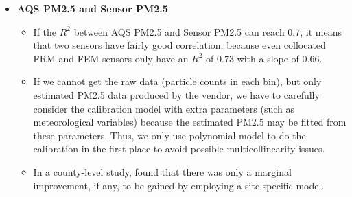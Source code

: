 \documentclass{article}
\begin{document}
\begin{itemize}
{\begin{itemize}
\begin{itemize}
                \end{itemize}
            \item \textbf{High and low volume air samplers/Gravimetric filters (FRM)}: high and low volume air samplers are instruments used to collect samples of air particles. The difference between high and low volume air samplers is the amount of air sampled\footnote{High volume: $1500\;m^3/24\;h$; Low volume: $\leq24\;m^3/24\;h$}. Steps: 1) The inlet removes particles larger than $10 \mu m$/$2.5 \mu m$ by using their greater inertia; 2) measuring the volume of air sampled and weighing the filters before and after sampling determines the concentration of PM10/PM2.5 particles in the air.
            \item \textbf{Beta attenuation monitoring (FEM)}: BAM employs the absorption of beta radiation\footnote{Beta radiation is a high-energy, high-speed electron or positron emitted by the radioactive decay of an atomic nucleus during the process of beta decay.} by solid particles extracted from air flow. The main principle is based on a kind of Bouguer (Lambert–Beer) law: the amount by which the flow of beta radiation (electrons) is attenuated by a solid matter is exponentially dependent on its mass and not on any other feature (such as density, chemical composition or some optical or electrical properties) of this matter.
        \end{itemize}
    }
    \item \textbf{AQS PM2.5 and Sensor PM2.5} {
        \begin{itemize}
            \item If the $R^2$ between AQS PM2.5 and Sensor PM2.5 can reach 0.7, it means that two sensors have fairly good correlation, because even collocated FRM and FEM sensors only have an $R^2$ of $0.73$ with a slope of 0.66. \citep{carvlin2017development}
            \item If we cannot get the raw data (particle counts in each bin), but only estimated PM2.5 data produced by the vendor, we have to carefully consider the calibration model with extra parameters (such as meteorological variables) because the estimated PM2.5 may be fitted from these parameters. Thus, we only use polynomial model to do the calibration in the first place to avoid possible multicollinearity issues. 
            \item In a county-level study, \citet{carvlin2017development} found that there was only a marginal improvement, if any, to be gained by employing a site-specific model. 

\end{itemize}}
\end{itemize}
\end{document}
